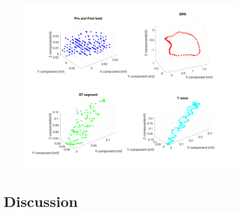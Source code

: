 \documentclass[12pt]{article}
\begin{document}
\begin{figure}[H]
	
	\centering
	\includegraphics[width = .95\textwidth]{Figures/BSP_run4_3d.png}
	\caption{ }
	\label{fig:BSP4}
\end{figure}



\section{Discussion}





\end{document}
